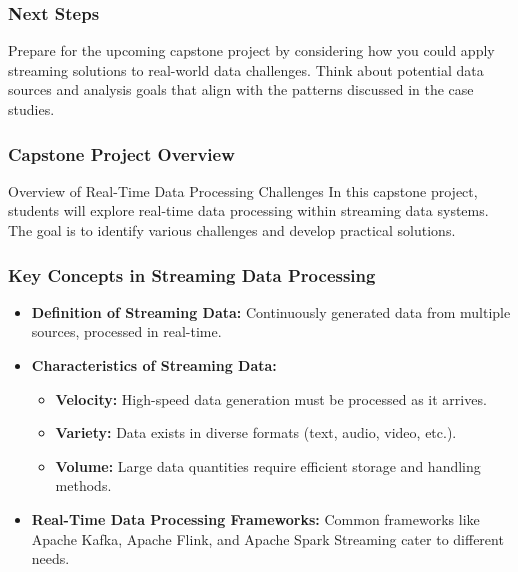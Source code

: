 \documentclass[aspectratio=169]{beamer}
\begin{document}
\begin{frame}[fragile]
    \frametitle{Next Steps}
    Prepare for the upcoming capstone project by considering how you could apply streaming solutions to real-world data challenges. 
    Think about potential data sources and analysis goals that align with the patterns discussed in the case studies.
\end{frame}

\begin{frame}[fragile]
    \frametitle{Capstone Project Overview}
    \begin{block}{Overview of Real-Time Data Processing Challenges}
        In this capstone project, students will explore real-time data processing within streaming data systems. 
        The goal is to identify various challenges and develop practical solutions.
    \end{block}
\end{frame}

\begin{frame}[fragile]
    \frametitle{Key Concepts in Streaming Data Processing}
    \begin{itemize}
        \item \textbf{Definition of Streaming Data:} 
        Continuously generated data from multiple sources, processed in real-time.
        
        \item \textbf{Characteristics of Streaming Data:}
        \begin{itemize}
            \item \textbf{Velocity:} High-speed data generation must be processed as it arrives.
            \item \textbf{Variety:} Data exists in diverse formats (text, audio, video, etc.).
            \item \textbf{Volume:} Large data quantities require efficient storage and handling methods.
        \end{itemize}
        
        \item \textbf{Real-Time Data Processing Frameworks:} 
        Common frameworks like Apache Kafka, Apache Flink, and Apache Spark Streaming cater to different needs. 
    \end{itemize}
\end{frame}
\end{document}
